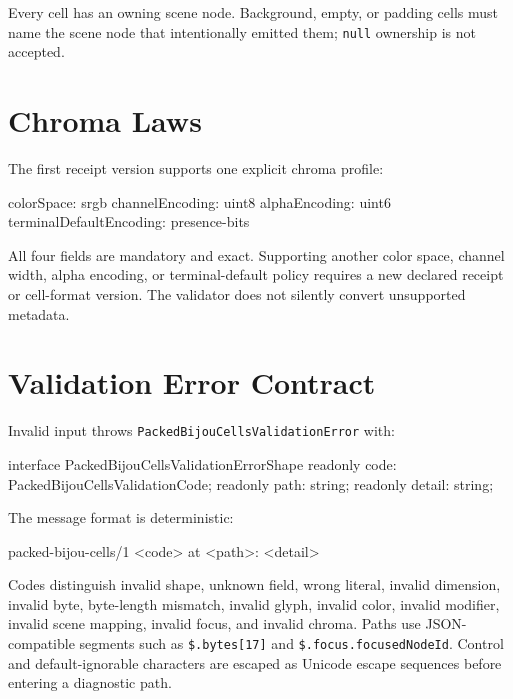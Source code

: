 Every cell has an owning scene node. Background, empty, or padding cells must name the scene node that intentionally emitted them; \texttt{n\allowbreak{}u\allowbreak{}l\allowbreak{}l} ownership is not accepted.

\section{Chroma Laws}\label{record-164-chroma-laws}

The first receipt version supports one explicit chroma profile:

\begin{CodeBlock}
colorSpace: srgb
channelEncoding: uint8
alphaEncoding: uint6
terminalDefaultEncoding: presence-bits
\end{CodeBlock}

All four fields are mandatory and exact. Supporting another color space, channel width, alpha encoding, or terminal-default policy requires a new declared receipt or cell-format version. The validator does not silently convert unsupported metadata.

\section{Validation Error Contract}\label{record-164-validation-error-contract}

Invalid input throws \texttt{P\allowbreak{}a\allowbreak{}c\allowbreak{}k\allowbreak{}e\allowbreak{}d\allowbreak{}B\allowbreak{}i\allowbreak{}j\allowbreak{}o\allowbreak{}u\allowbreak{}C\allowbreak{}e\allowbreak{}l\allowbreak{}l\allowbreak{}s\allowbreak{}V\allowbreak{}a\allowbreak{}l\allowbreak{}i\allowbreak{}d\allowbreak{}a\allowbreak{}t\allowbreak{}i\allowbreak{}o\allowbreak{}n\allowbreak{}E\allowbreak{}r\allowbreak{}r\allowbreak{}o\allowbreak{}r} with:

\begin{CodeBlock}
interface PackedBijouCellsValidationErrorShape {
  readonly code: PackedBijouCellsValidationCode;
  readonly path: string;
  readonly detail: string;
}
\end{CodeBlock}

The message format is deterministic:

\begin{CodeBlock}
packed-bijou-cells/1 <code> at <path>: <detail>
\end{CodeBlock}

Codes distinguish invalid shape, unknown field, wrong literal, invalid dimension, invalid byte, byte-length mismatch, invalid glyph, invalid color, invalid modifier, invalid scene mapping, invalid focus, and invalid chroma. Paths use JSON-compatible segments such as \texttt{\$\allowbreak{}.\allowbreak{}b\allowbreak{}y\allowbreak{}t\allowbreak{}e\allowbreak{}s\allowbreak{}[\allowbreak{}1\allowbreak{}7\allowbreak{}]} and \texttt{\$\allowbreak{}.\allowbreak{}f\allowbreak{}o\allowbreak{}c\allowbreak{}u\allowbreak{}s\allowbreak{}.\allowbreak{}f\allowbreak{}o\allowbreak{}c\allowbreak{}u\allowbreak{}s\allowbreak{}e\allowbreak{}d\allowbreak{}N\allowbreak{}o\allowbreak{}d\allowbreak{}e\allowbreak{}I\allowbreak{}d}. Control and default-ignorable characters are escaped as Unicode escape sequences before entering a diagnostic path.

